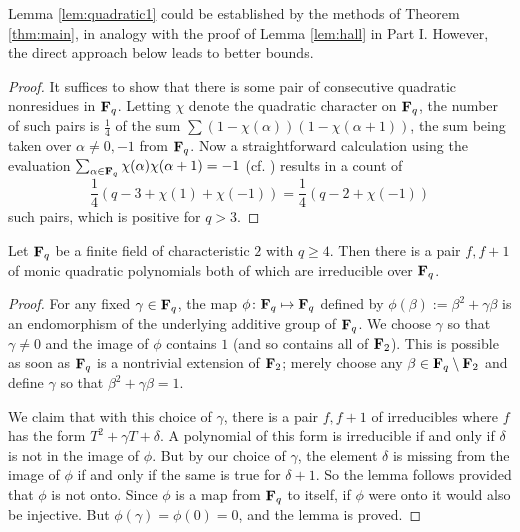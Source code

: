 \documentclass[a4paper]{compositio}
\begin{document}
Lemma \ref{lem:quadratic1} could be established by the methods of
Theorem \ref{thm:main}, in analogy with the proof of Lemma
\ref{lem:hall} in Part I. However, the direct approach below leads
to better bounds.

\begin{proof} It suffices to show that there is some pair of consecutive quadratic
nonresidues in $\mathbf{F}_q$. Letting $\chi$ denote the quadratic character
on $\mathbf{F}_q$, the number of such pairs is $\frac{1}{4}$ of the sum
$\sum(1-\chi(\alpha))(1-\chi(\alpha+1))$, the sum being taken over
$\alpha \neq 0, -1$ from $\mathbf{F}_q$. Now a straightforward calculation
using the evaluation $\sum_{\alpha \in \mathbf{F}_q}
\chi(\alpha)\chi(\alpha+1) = -1$ (cf. \cite[Theorem 2.1.2]{bew98})
results in a count of
\[ \frac{1}{4}\left(q-3 +\chi(1) + \chi(-1)\right) = \frac{1}{4}
\left(q-2 + \chi(-1)\right)\] such pairs, which is positive for $q >
3$.
\end{proof}
\begin{lem}\label{lem:quadratic2} Let $\mathbf{F}_q$ be a finite field of characteristic $2$ with $q\geq 4$.
Then there is a pair $f, f+1$ of monic quadratic polynomials both of
which are irreducible over $\mathbf{F}_q$.
\end{lem}
\begin{proof} For any fixed $\gamma \in \mathbf{F}_q$, the map $\phi\colon
\mathbf{F}_q\mapsto\mathbf{F}_q$ defined by $\phi(\beta) := \beta^2+\gamma\beta$ is
an endomorphism of the underlying additive group of $\mathbf{F}_q$. We
choose $\gamma$ so that $\gamma \neq 0$ and the image of $\phi$
contains $1$ (and so contains all of $\mathbf{F}_2$). This is possible as
soon as $\mathbf{F}_q$ is a nontrivial extension of $\mathbf{F}_2$; merely choose
any $\beta \in \mathbf{F}_q\setminus \mathbf{F}_2$ and define $\gamma$ so that
$\beta^2+\gamma\beta = 1$.

We claim that with this choice of $\gamma$, there is a pair $f, f+1$
of irreducibles where $f$ has the form $T^2+\gamma T + \delta$. A
polynomial of this form is irreducible if and only if $\delta$ is
not in the image of $\phi$. But by our choice of $\gamma$, the
element $\delta$ is missing from the image of $\phi$ if and only if
the same is true for $\delta+1$. So the lemma follows provided that
$\phi$ is not onto. Since $\phi$ is a map from $\mathbf{F}_q$ to itself, if
$\phi$ were onto it would also be injective. But $\phi(\gamma) =
\phi(0) = 0$, and the lemma is proved.\end{proof}
\end{document}
